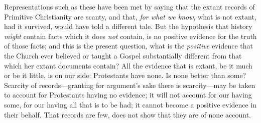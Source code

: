Representations such as these have been met by saying that the
extant records of Primitive Christianity are scanty, and that, \emph{for
what we know}, what is not extant, had it survived, would have told
a different tale. But the hypothesis that history \emph{might} contain
facts which it does \emph{not} contain, is no positive evidence for
the truth of those facts; and this is the present question, what is
the \emph{positive} evidence that the Church ever believed or taught a
Gospel substantially different from that which her extant documents
contain? All the evidence that is extant, be it much or be it little,
is on our side: Protestants have none. Is none better than some?
Scarcity of records—granting for argument's sake there is scarcity—may
be taken to account for Protestants having no evidence; it will not
account for our having some, for our having all that is to be had; it
cannot become a positive evidence in their behalf. That records are
few, does not show that they are of none account.

